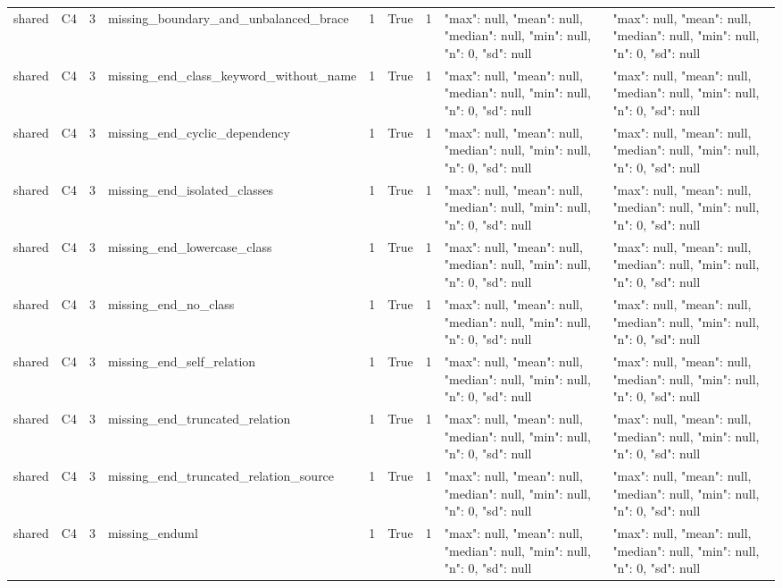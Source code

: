 \begin{tabular}{lllllllll}
shared & C4 & 3 & missing\_boundary\_and\_unbalanced\_brace & 1 & True & 1 & {"max": null, "mean": null, "median": null, "min": null, "n": 0, "sd": null} & {"max": null, "mean": null, "median": null, "min": null, "n": 0, "sd": null} \\
shared & C4 & 3 & missing\_end\_class\_keyword\_without\_name & 1 & True & 1 & {"max": null, "mean": null, "median": null, "min": null, "n": 0, "sd": null} & {"max": null, "mean": null, "median": null, "min": null, "n": 0, "sd": null} \\
shared & C4 & 3 & missing\_end\_cyclic\_dependency & 1 & True & 1 & {"max": null, "mean": null, "median": null, "min": null, "n": 0, "sd": null} & {"max": null, "mean": null, "median": null, "min": null, "n": 0, "sd": null} \\
shared & C4 & 3 & missing\_end\_isolated\_classes & 1 & True & 1 & {"max": null, "mean": null, "median": null, "min": null, "n": 0, "sd": null} & {"max": null, "mean": null, "median": null, "min": null, "n": 0, "sd": null} \\
shared & C4 & 3 & missing\_end\_lowercase\_class & 1 & True & 1 & {"max": null, "mean": null, "median": null, "min": null, "n": 0, "sd": null} & {"max": null, "mean": null, "median": null, "min": null, "n": 0, "sd": null} \\
shared & C4 & 3 & missing\_end\_no\_class & 1 & True & 1 & {"max": null, "mean": null, "median": null, "min": null, "n": 0, "sd": null} & {"max": null, "mean": null, "median": null, "min": null, "n": 0, "sd": null} \\
shared & C4 & 3 & missing\_end\_self\_relation & 1 & True & 1 & {"max": null, "mean": null, "median": null, "min": null, "n": 0, "sd": null} & {"max": null, "mean": null, "median": null, "min": null, "n": 0, "sd": null} \\
shared & C4 & 3 & missing\_end\_truncated\_relation & 1 & True & 1 & {"max": null, "mean": null, "median": null, "min": null, "n": 0, "sd": null} & {"max": null, "mean": null, "median": null, "min": null, "n": 0, "sd": null} \\
shared & C4 & 3 & missing\_end\_truncated\_relation\_source & 1 & True & 1 & {"max": null, "mean": null, "median": null, "min": null, "n": 0, "sd": null} & {"max": null, "mean": null, "median": null, "min": null, "n": 0, "sd": null} \\
shared & C4 & 3 & missing\_enduml & 1 & True & 1 & {"max": null, "mean": null, "median": null, "min": null, "n": 0, "sd": null} & {"max": null, "mean": null, "median": null, "min": null, "n": 0, "sd": null} \\

\end{tabular}
